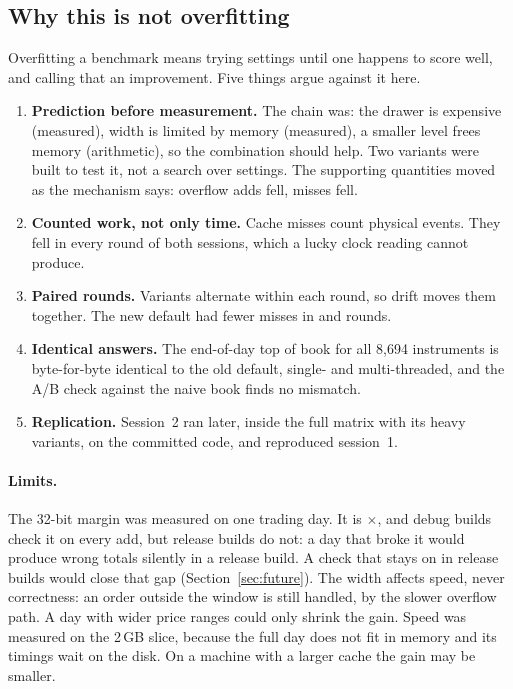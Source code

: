 \documentclass[10pt,a4paper]{article}
\begin{document}
\subsection{Why this is not overfitting}
Overfitting a benchmark means trying settings until one happens to score well, and calling that an improvement. Five things argue against it here.
\begin{enumerate}
  \item \textbf{Prediction before measurement.} The chain was: the drawer is expensive (measured), width is limited by memory (measured), a smaller level frees memory (arithmetic), so the combination should help.
        Two variants were built to test it, not a search over settings. The supporting quantities moved as the mechanism says: overflow adds fell, misses fell.
  \item \textbf{Counted work, not only time.} Cache misses count physical events. They fell in every round of both sessions, which a lucky clock reading cannot produce.
  \item \textbf{Paired rounds.} Variants alternate within each round, so drift moves them together. The new default had fewer misses in \SoneWFewer{} and \CfibwFewer{} rounds.
  \item \textbf{Identical answers.} The end-of-day top of book for all 8{,}694 instruments is byte-for-byte identical to the old default, single- and multi-threaded, and the A/B check against the naive book finds no mismatch.
  \item \textbf{Replication.} Session~2 ran later, inside the full matrix with its heavy variants, on the committed code, and reproduced session~1.
\end{enumerate}

\paragraph{Limits.} The 32-bit margin was measured on one trading day. It is \LmHeadroom$\times$, and debug builds check it on every add, but release builds do not:
a day that broke it would produce wrong totals silently in a release build. A check that stays on in release builds would close that gap (Section~\ref{sec:future}).
The width affects speed, never correctness: an order outside the window is still handled, by the slower overflow path. A day with wider price ranges could only shrink the gain.
Speed was measured on the 2\,GB slice, because the full day does not fit in memory and its timings wait on the disk. On a machine with a larger cache the gain may be smaller.
\end{document}
